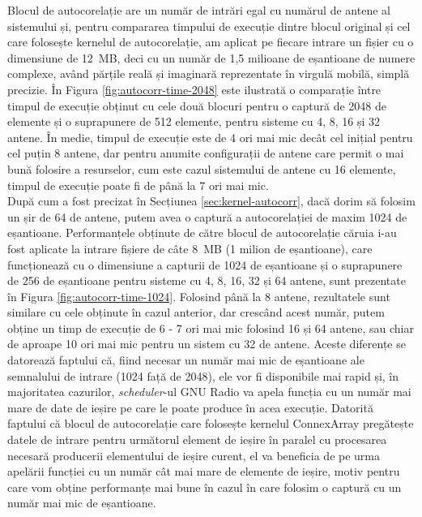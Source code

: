 Blocul de autocorelație are un număr de intrări egal cu numărul de antene al
sistemului și, pentru compararea timpului de execuție dintre blocul original și
cel care folosește kernelul de autocorelație, am aplicat pe fiecare intrare un
fișier cu o dimensiune de \SI{12}{MB}, deci cu un număr de 1,5 milioane de
eșantioane de numere complexe, având părțile reală și imaginară reprezentate în
virgulă mobilă, simplă precizie. În Figura \ref{fig:autocorr-time-2048} este
ilustrată o comparație între timpul de execuție obținut cu cele două blocuri
pentru o captură de 2048 de elemente și o suprapunere de 512 elemente, pentru
sisteme cu 4, 8, 16 și 32 antene. În medie, timpul de execuție este de 4 ori mai
mic decât cel inițial pentru cel puțin 8 antene, dar pentru anumite configurații
de antene care permit o mai bună folosire a resurselor, cum este cazul
sistemului de antene cu 16 elemente, timpul de execuție poate fi de până la 7
ori mai mic. \\

După cum a fost precizat în Secțiunea \ref{sec:kernel-autocorr}, dacă dorim să
folosim un șir de 64 de antene, putem avea o captură a autocorelației de maxim 1024
de eșantioane. Performanțele obținute de către blocul de autocorelație căruia
i-au fost aplicate la intrare fișiere de câte \SI{8}{MB} (1 milion de
eșantioane), care funcționează cu o dimensiune a capturii de 1024 de eșantioane
și o suprapunere de 256 de eșantioane pentru sisteme cu 4, 8, 16, 32 și 64
antene, sunt prezentate în Figura \ref{fig:autocorr-time-1024}. Folosind până la
8 antene, rezultatele sunt similare cu cele obținute în cazul anterior, dar
crescând acest număr, putem obține un timp de execuție de 6 - 7 ori mai mic
folosind 16 și 64 antene, sau chiar de aproape 10 ori mai mic pentru un sistem
cu 32 de antene. Aceste diferențe se datorează faptului că, fiind necesar un număr
mai mic de eșantioane ale semnalului de intrare (1024 față de 2048), ele vor fi
disponibile mai rapid și, în majoritatea cazurilor, \textit{scheduler}-ul GNU
Radio va apela funcția  cu un număr mai mare de date de ieșire pe
care le poate produce în acea execuție. Datorită faptului că blocul de
autocorelație care folosește kernelul ConnexArray pregătește datele de intrare
pentru următorul element de ieșire în paralel cu procesarea necesară producerii
elementului de ieșire curent, el va beneficia de pe urma apelării funcției
 cu un număr cât mai mare de elemente de ieșire, motiv pentru care
vom obține performanțe mai bune în cazul în care folosim o captură cu un număr
mai mic de eșantioane.

